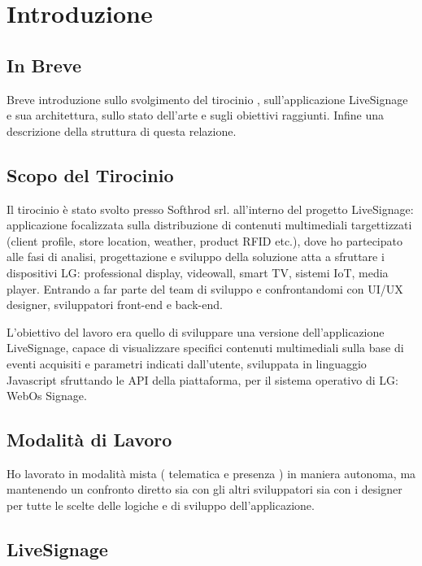 \chapter{Introduzione}
\linespread{1.5}

\section{In Breve}
Breve introduzione sullo  svolgimento del tirocinio , sull'applicazione LiveSignage e sua architettura, sullo stato dell'arte e sugli obiettivi raggiunti. Infine una descrizione della struttura di questa relazione.

\section{Scopo del Tirocinio}

Il tirocinio è stato svolto presso Softhrod srl. all'interno del progetto LiveSignage: applicazione focalizzata sulla distribuzione di contenuti multimediali targettizzati (client profile, store location, weather, product RFID etc.), dove ho partecipato alle fasi di analisi, progettazione e sviluppo della soluzione atta a sfruttare i dispositivi LG: professional display, videowall, smart TV, sistemi IoT, media player. Entrando a far parte del team di sviluppo e confrontandomi con UI/UX designer, sviluppatori front-end e back-end.

L'obiettivo del lavoro era quello di sviluppare una versione dell'applicazione LiveSignage, capace di visualizzare specifici contenuti multimediali sulla base di eventi acquisiti e parametri indicati dall'utente, sviluppata in linguaggio Javascript sfruttando le API  della piattaforma, per il sistema operativo di LG: WebOs Signage.

\section{Modalità di Lavoro}

Ho lavorato in modalità mista ( telematica e presenza ) in maniera autonoma, ma mantenendo un confronto diretto sia con gli altri sviluppatori sia con i designer per tutte le scelte delle logiche e di sviluppo dell'applicazione. 

\section{LiveSignage}

